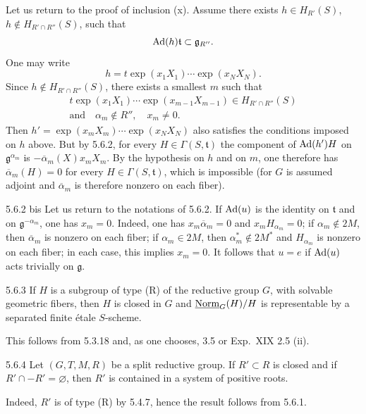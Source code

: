 Let us return to the proof of inclusion (x). Assume there exists $h\in H_{R'}(S)$, $h\notin H_{R'\cap R''}(S)$, such that
\[
\operatorname{Ad}(h)\mathfrak t\subset\mathfrak g_{R''}.
\]
One may write
\[
h=t\exp(x_1X_1)\cdots\exp(x_NX_N).
\]
Since $h\notin H_{R'\cap R''}(S)$, there exists a smallest $m$ such that
\[
\begin{gathered}
t\exp(x_1X_1)\cdots\exp(x_{m-1}X_{m-1})\in H_{R'\cap R''}(S)\\
\text{and}\quad\alpha_m\notin R'',\quad x_m\ne0.
\end{gathered}
\]
Then $h'=\exp(x_mX_m)\cdots\exp(x_NX_N)$ also satisfies the conditions imposed on $h$ above. But by 5.6.2, for every $H\in\Gamma(S,\mathfrak t)$ the component of $\operatorname{Ad}(h')H$ on $\mathfrak g^{\alpha_m}$ is $-\overline\alpha_m(X)x_mX_m$. By the hypothesis on $h$ and on $m$, one therefore has $\overline\alpha_m(H)=0$ for every $H\in\Gamma(S,\mathfrak t)$, which is impossible (for $G$ is assumed adjoint and $\overline\alpha_m$ is therefore nonzero on each fiber).
\begin{remark}{5.6.2 bis}\label{XXII.5.6.2bis}
Let us return to the notations of 5.6.2. If $\operatorname{Ad}(u)$ is the identity on $\mathfrak t$ and on $\mathfrak g^{-\alpha_m}$, one has $x_m=0$. Indeed, one has $x_m\overline\alpha_m=0$ and $x_mH_{\alpha_m}=0$; if $\alpha_m\notin2M$, then $\overline\alpha_m$ is nonzero on each fiber; if $\alpha_m\in2M$, then $\alpha_m^*\notin2M^*$ and $H_{\alpha_m}$ is nonzero on each fiber; in each case, this implies $x_m=0$. It follows that $u=e$ if $\operatorname{Ad}(u)$ acts trivially on $\mathfrak g$.
\end{remark}
\begin{remark}{5.6.3}\label{XXII.5.6.3}
If $H$ is a subgroup of type (R) of the reductive group $G$, with solvable geometric fibers, then $H$ is closed in $G$ and $\underline{\mathrm{Norm}}_G(H)/H$ is representable by a separated finite \'etale $S$-scheme.
\end{remark}
This follows from 5.3.18 and, as one chooses, 3.5 or Exp.~XIX 2.5 (ii).
\begin{corollary}{5.6.4}\label{XXII.5.6.4}
Let $(G,T,M,R)$ be a split reductive group. If $R'\subset R$ is closed and if $R'\cap-R'=\varnothing$, then $R'$ is contained in a system of positive roots.{\renewcommand{\thefootnote}{(41)}}
\end{corollary}
Indeed, $R'$ is of type (R) by 5.4.7, hence the result follows from 5.6.1.

